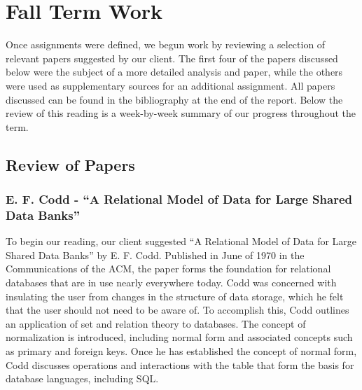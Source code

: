 \documentclass[onecolumn, draftclsnofoot,10pt, compsoc]{IEEEtran}
\begin{document}
\section{Fall Term Work}

Once assignments were defined, we begun work by reviewing a selection of relevant papers suggested by our client. 
The first four of the papers discussed below were the subject of a more detailed analysis and paper, while the others were used as supplementary sources for an additional assignment. 
All papers discussed can be found in the bibliography at the end of the report.
Below the review of this reading is a week-by-week summary of our progress throughout the term.

\subsection{Review of Papers}

\subsubsection{E. F. Codd - “A Relational Model of Data for Large Shared Data Banks”}

To begin our reading, our client suggested “A Relational Model of Data for Large Shared Data Banks” by E. F. Codd.
Published in June of 1970 in the Communications of the ACM, the paper forms the foundation for relational databases that are in use nearly everywhere today.
Codd was concerned with insulating the user from changes in the structure of data storage, which he felt that the user should not need to be aware of.
To accomplish this, Codd outlines an application of set and relation theory to databases. 
The concept of normalization is introduced, including normal form and associated concepts such as primary and foreign keys.
Once he has established the concept of normal form, Codd discusses operations and interactions with the table that form the basis for database languages, including SQL. 
\end{document}
